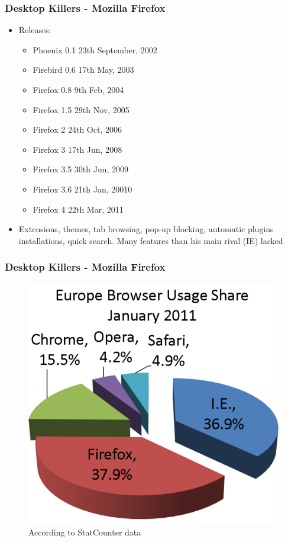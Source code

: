 \documentclass{beamer}
\begin{document}
\begin{frame}
\frametitle{Desktop Killers - Mozilla Firefox}

\begin{itemize}
\item Releases:
	\begin{itemize}
	\item Phoenix 0.1 23th September, 2002
	\item Firebird 0.6 17th May, 2003
	\item Firefox 0.8 9th Feb, 2004
	\item Firefox 1.5 29th Nov, 2005
	\item Firefox 2 24th Oct, 2006
	\item Firefox 3 17th Jun, 2008
	\item Firefox 3.5 30th Jun, 2009
	\item Firefox 3.6 21th Jan, 20010
	\item Firefox 4  22th Mar, 2011
	\end{itemize}
\item Extensions, themes, tab browsing, pop-up blocking, automatic plugins installations, quick search. Many features than his main rival (IE) lacked
\end{itemize}
\end{frame}



\begin{frame}
\frametitle{Desktop Killers - Mozilla Firefox}
\begin{figure}
 \includegraphics[scale=0.55]{figs/stats1}
 \caption {According to StatCounter data }
\end{figure}
\end{frame}
\end{document}
